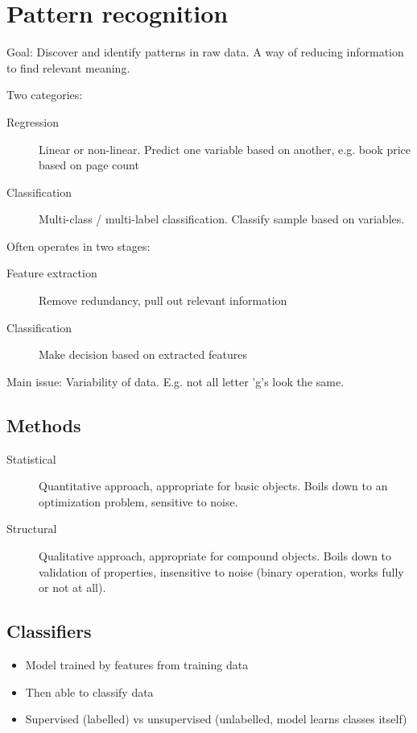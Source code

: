 \section{Pattern recognition}

Goal: Discover and identify patterns in raw data. A way of reducing information
to find relevant meaning.

Two categories:

\begin{description}
		\item[Regression] Linear or non-linear. Predict one variable based on
				another, e.g. book price based on page count
		\item[Classification] Multi-class / multi-label classification.
				Classify sample based on variables.
\end{description}

Often operates in two stages:

\begin{description}
		\item[Feature extraction] Remove redundancy, pull out relevant information
		\item[Classification] Make decision based on extracted features
\end{description}

Main issue: Variability of data. E.g. not all letter 'g's look the same.

\subsection{Methods}

\begin{description}
		\item[Statistical] Quantitative approach, appropriate for basic
				objects. Boils down to an optimization problem, sensitive to
				noise.
		\item[Structural] Qualitative approach, appropriate for compound
				objects. Boils down to validation of properties, insensitive to
				noise (binary operation, works fully or not at all).
\end{description}

\subsection{Classifiers}

\begin{itemize}
		\item Model trained by features from training data
		\item Then able to classify data
		\item Supervised (labelled) vs unsupervised (unlabelled, model learns classes itself)
\end{itemize}

